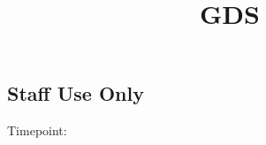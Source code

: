 \documentclass[
  14pt,
  english,
  a4paper,
  sdaps_style=qr,
  checkmode=check
]{sdapsclassic}
\title{GDS}
\author{}
\date{}
\begin{document}
\begin{questionnaire}[noinfo]


\section{Staff Use Only}

    \noindent
    \begin{minipage}[t]{0.48\linewidth}
    \end{minipage}\hfill
    \begin{minipage}[t]{0.48\linewidth}
    \end{minipage}

    \noindent
    \begin{minipage}[c]{3cm}
        Timepoint:
    \end{minipage}%
    \begin{minipage}[c]{\dimexpr\linewidth-3cm\relax}
        \begin{optionquestion}[cols=3, var=timepoint]{}
        \end{optionquestion}
    \end{minipage}


\end{questionnaire}
\end{document}
